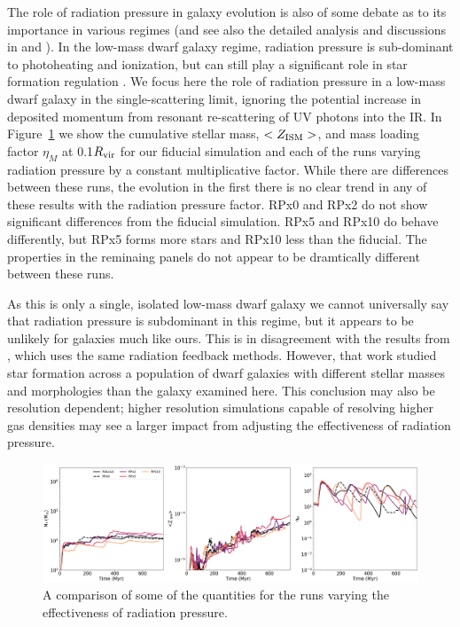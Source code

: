 \documentclass[twocolumn]{aastex62}
\begin{document}
The role of radiation pressure in galaxy evolution is also of some debate as to its importance in various regimes \citep[e.g.][]{HQM2011,HQM2012,Agertz2013,Ceverino2014,Sales2015,Rosdahl2015,Kannan2020} (and see also the detailed analysis and discussions in \citet{Krumholz2018} and \citet{Hopkins2019}). In the low-mass dwarf galaxy regime, radiation pressure is sub-dominant to photoheating and ionization, but can still play a significant role in star formation regulation \citep{WiseAbel2012}. We focus here the role of radiation pressure in a low-mass dwarf galaxy in the single-scattering limit, ignoring the potential increase in deposited momentum from resonant re-scattering of UV photons into the IR. In Figure~\ref{fig:RP} we show the cumulative stellar mass, $<Z_{\rm ISM}>$, and mass loading factor $\eta_{M}$ at 0.1$R_{\rm vir}$ for our fiducial simulation and each of the runs varying radiation pressure by a constant multiplicative factor. While there are differences between these runs, the evolution in the first there is no clear trend in any of these results with the radiation pressure factor. RPx0 and RPx2 do not show significant differences from the fiducial simulation. RPx5 and RPx10 do behave differently, but RPx5 forms more stars and RPx10 less than the fiducial. The properties in the reminaing panels do not appear to be dramtically different between these runs.

As this is only a single, isolated low-mass dwarf galaxy we cannot universally say that radiation pressure is subdominant in this regime, but it appears to be unlikely for galaxies much like ours. This is in disagreement with the results from \citet{WiseAbel2012}, which uses the same radiation feedback methods. However, that work studied star formation across a population of dwarf galaxies with different stellar masses and morphologies than the galaxy examined here. This conclusion may also be resolution dependent; higher resolution simulations capable of resolving higher gas densities may see a larger impact from adjusting the effectiveness of radiation pressure.

\begin{figure}
  \centering
  \includegraphics[width=0.95\linewidth]{figures/physics_RP_comparison}
  \caption{A comparison of some of the quantities for the runs varying the effectiveness of radiation pressure.}
  \label{fig:RP}
\end{figure}
\end{document}

